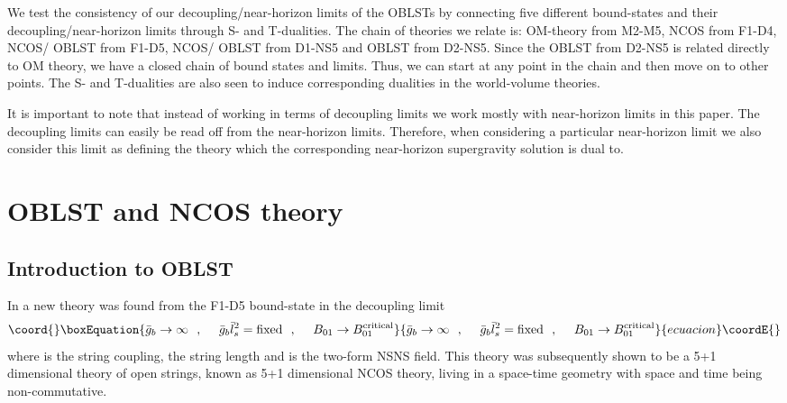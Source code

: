 \documentclass[a4paper,twoside,titlepage,12pt]{article}
\begin{document}
We test the consistency of our decoupling/near-horizon 
limits of the OBLSTs by connecting five different bound-states
and their decoupling/near-horizon limits through S- and T-dualities.
The chain of theories we relate is: OM-theory from M2-M5, \coordHE{} NCOS from
F1-D4, \coordHE{} NCOS/\coordHE{} OBLST from F1-D5, \coordHE{} NCOS/\coordHE{} OBLST
from D1-NS5 and \coordHE{} OBLST from D2-NS5. Since the \coordHE{} OBLST
from D2-NS5 is related directly to OM theory, we have a closed chain
of bound states and limits.
Thus, we can start at any point in the chain and then move on to
other points. 
The S- and T-dualities are also seen to induce corresponding dualities
in the world-volume theories.


It is important to note that instead 
of working in terms of decoupling limits we work mostly with
near-horizon limits in this paper. 
The decoupling limits can easily be read off from the 
near-horizon limits.
Therefore, when considering a particular near-horizon limit
we also consider this limit as defining the theory 
which the corresponding near-horizon supergravity solution
is dual to.





\section{\coordHE{} OBLST and \coordHE{} NCOS theory}
\label{secOBLST11}

\subsection{Introduction to \coordHE{} OBLST}

In \cite{Gopakumar:2000na} a new theory was found from the F1-D5 bound-state 
in the decoupling limit
%
\begin{equation}\coord{}\boxEquation{
\gsbb \rightarrow \infty \spa
\gsbb \lsb^2 = \mbox{fixed} \spa
B_{01} \rightarrow B_{01}^{\rm critical}
}{
\gsbb \rightarrow \infty \spa
\gsbb \lsb^2 = \mbox{fixed} \spa
B_{01} \rightarrow B_{01}^{\rm critical}
}{ecuacion}\coordE{}\end{equation}
%
where \myHighlight{$\gsbb$}\coordHE{} is the string coupling, \myHighlight{$\lsb$}\coordHE{} the string length and
\coordHE{} is the two-form NSNS field.
This theory was subsequently shown to be a 
5+1 dimensional theory of open strings, known as 5+1 dimensional NCOS theory, 
living in a space-time geometry with space and time being non-commutative. 
\end{document}
